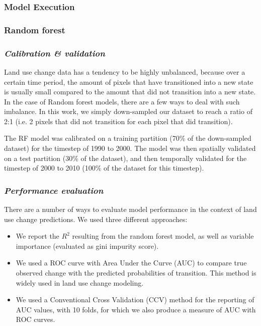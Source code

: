 \subsubsection{Model Execution}

\subsubsection*{Random forest}

\subsubsection*{\textit{Calibration \& validation}}

Land use change data has a tendency to be highly unbalanced, because over a certain time period, the amount of pixels that have transitioned into a new state is usually small compared to the amount that did not transition into a new state. In the case of Random forest models, there are a few ways to deal with such imbalance. In this work, we simply down-sampled our dataset to reach a ratio of 2:1 (i.e. 2 pixels that did not transition for each pixel that did transition).

The RF model was calibrated on a training partition (70\% of the down-sampled dataset) for the timestep of 1990 to 2000. The model was then spatially validated on a test partition (30\% of the dataset), and then temporally validated for the timestep of 2000 to 2010 (100\% of the dataset for this timestep). \\

\subsubsection*{\textit{Performance evaluation}}

There are a number of ways to evaluate model performance in the context of land use change predictions. We used three different approaches:
\begin{itemize}
\item We report the $R^{2}$ resulting from the random forest model, as well as variable importance (evaluated as gini impurity score).
\item We used a ROC curve with Area Under the Curve (AUC) to compare true observed change with the predicted probabilities of transition. This method is widely used in land use change modeling. %
\item We used a Conventional Cross Validation (CCV) method for the reporting of AUC values, with 10 folds, for which we also produce a measure of AUC with ROC curves.\\
\end{itemize}

